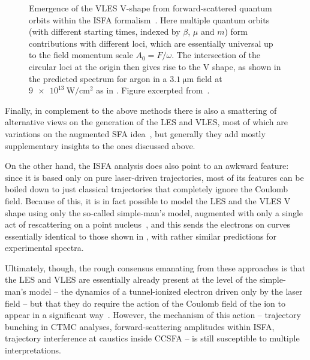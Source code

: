 \begin{figure}[htb]
\begin{tabular}{ccc}
  \end{tabular}
  \caption[
  Emergence of the VLES V-shape from forward-scattered quantum orbits within the ISFA formalism, as presented by W. Becker et al.
  ]{
  Emergence of the VLES V-shape from forward-scattered quantum orbits within the ISFA formalism~\cite{becker_ATI-low-energy_2015}. Here multiple quantum orbits (with different starting times, indexed by $\beta$, $\mu$ and $m$) form contributions with different loci, which are essentially universal up to the field momentum scale $A_0=F/\omega$. The intersection of the circular loci at the origin then gives rise to the V shape, as shown in the predicted spectrum \protect{} for argon in a $\SI{3.1}{\micro\meter}$ field at $\SI{9e13}{\watt/\centi\meter^2}$ as in . Figure excerpted from~.
  }
\label{f6-becker-circles-original-figure}
\end{figure}



Finally, in complement to the above methods there is also a smattering of alternative views on the generation of the LES and VLES, most of which are variations on the augmented SFA idea~\cite{Titi_Drake_S_Matrix, Milosevic_LFA, murnane_TCSFA_tunnel_exit}, but generally they add mostly supplementary insights to the ones discussed above.



On the other hand, the ISFA analysis does also point to an awkward feature: since it is based only on pure laser-driven trajectories, most of its features can be boiled down to just classical trajectories that completely ignore the Coulomb field. Because of this, it is in fact possible to model the LES and the VLES V shape using only the so-called simple-man's model, augmented with only a single act of rescattering on a point nucleus~\cite{off_axis_LES}, and this sends the electrons on curves essentially identical to those shown in , with rather similar predictions for experimental spectra.



Ultimately, though, the rough consensus emanating from these approaches is that the LES and VLES are essentially already present at the level of the simple-man's model -- the dynamics of a tunnel-ionized electron driven only by the laser field -- but that they do require the action of the Coulomb field of the ion to appear in a significant way~\cite{Becker_rescattering}. However, the mechanism of this action -- trajectory bunching in CTMC analyses, forward-scattering amplitudes within ISFA, trajectory interference at caustics inside CCSFA -- is still susceptible to multiple interpretations. 


